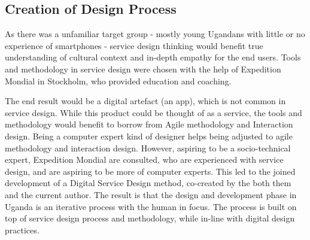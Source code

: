 


\subsection{Creation of Design Process}
As there was a unfamiliar target group - mostly young Ugandans with little or no experience of smartphones - service design thinking would benefit true understanding of cultural context and in-depth empathy for the end users. Tools and methodology in service design were chosen with the help of Expedition Mondial in Stockholm, who provided education and coaching.

The end result would be a digital artefact (an app), which is not common in service design. While this product could be thought of as a service, the tools and methodology would benefit to borrow from Agile methodology and Interaction design. Being a computer expert kind of designer \citep{lowgren} helps being adjusted to agile methodology and interaction design. However, aspiring to be a socio-technical expert, Expedition Mondial are consulted, who are experienced with service design, and are aspiring to be more of computer experts. This led to the joined development of a Digital Service Design method, co-created by the both them and the current author. The result is that the design and development phase in Uganda is an iterative process with the human in focus. The process is built on top of service design process and methodology, while in-line with digital design practices.



